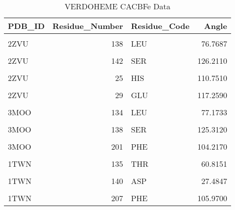 	\begin{table}
		\caption{VERDOHEME CACBFe Data}
		\label{tbl:VERDOHEME_cab}
		\centering
		\begin{tabular}{lrlr}
			\toprule
			PDB\_ID & Residue\_Number & Residue\_Code & Angle\\
			\midrule
			\cellcolor{gray!6}{2ZVU} & \cellcolor{gray!6}{135} & \cellcolor{gray!6}{THR} & \cellcolor{gray!6}{58.6713}\\
			2ZVU & 138 & LEU & 76.7687\\
			\cellcolor{gray!6}{2ZVU} & \cellcolor{gray!6}{140} & \cellcolor{gray!6}{ASP} & \cellcolor{gray!6}{26.6732}\\
			2ZVU & 142 & SER & 126.2110\\
			\cellcolor{gray!6}{2ZVU} & \cellcolor{gray!6}{207} & \cellcolor{gray!6}{PHE} & \cellcolor{gray!6}{105.4400}\\
			\addlinespace
			2ZVU & 25 & HIS & 110.7510\\
			\cellcolor{gray!6}{2ZVU} & \cellcolor{gray!6}{28} & \cellcolor{gray!6}{ALA} & \cellcolor{gray!6}{120.0970}\\
			2ZVU & 29 & GLU & 117.2590\\
			\cellcolor{gray!6}{3MOO} & \cellcolor{gray!6}{131} & \cellcolor{gray!6}{VAL} & \cellcolor{gray!6}{60.1702}\\
			3MOO & 134 & LEU & 77.1733\\
			\addlinespace
			\cellcolor{gray!6}{3MOO} & \cellcolor{gray!6}{136} & \cellcolor{gray!6}{ASP} & \cellcolor{gray!6}{23.6316}\\
			3MOO & 138 & SER & 125.3120\\
			\cellcolor{gray!6}{3MOO} & \cellcolor{gray!6}{20} & \cellcolor{gray!6}{HIS} & \cellcolor{gray!6}{111.0890}\\
			3MOO & 201 & PHE & 104.2170\\
			\cellcolor{gray!6}{3MOO} & \cellcolor{gray!6}{24} & \cellcolor{gray!6}{GLU} & \cellcolor{gray!6}{110.6430}\\
			\addlinespace
			1TWN & 135 & THR & 60.8151\\
			\cellcolor{gray!6}{1TWN} & \cellcolor{gray!6}{138} & \cellcolor{gray!6}{LEU} & \cellcolor{gray!6}{75.1317}\\
			1TWN & 140 & ASP & 27.4847\\
			\cellcolor{gray!6}{1TWN} & \cellcolor{gray!6}{142} & \cellcolor{gray!6}{SER} & \cellcolor{gray!6}{114.7150}\\
			1TWN & 207 & PHE & 105.9700\\

\end{tabular}
\end{table}
